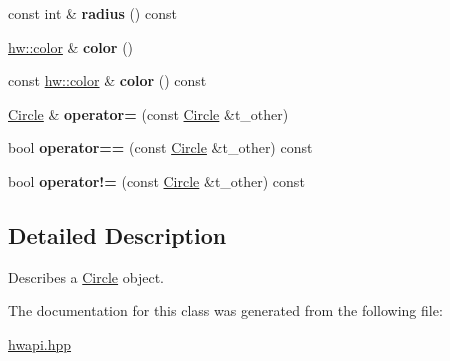 \begin{DoxyCompactItemize}
const int \& {\bfseries radius} () const
\item 
\mbox{\label{classdummy__api_1_1Circle_a800ad92a438310c71e11631c3adce684}} 
\mbox{\hyperlink{structhw_1_1color}{hw\+::color}} \& {\bfseries color} ()
\item 
\mbox{\label{classdummy__api_1_1Circle_a1be15dd16d55353e67e3175976c852a1}} 
const \mbox{\hyperlink{structhw_1_1color}{hw\+::color}} \& {\bfseries color} () const
\item 
\mbox{\label{classdummy__api_1_1Circle_aba499d1750ac58b781b2d22524c51095}} 
\mbox{\hyperlink{classdummy__api_1_1Circle}{Circle}} \& {\bfseries operator=} (const \mbox{\hyperlink{classdummy__api_1_1Circle}{Circle}} \&t\+\_\+other)
\item 
\mbox{\label{classdummy__api_1_1Circle_a97753a3826f553fd712e4e532d0e0684}} 
bool {\bfseries operator==} (const \mbox{\hyperlink{classdummy__api_1_1Circle}{Circle}} \&t\+\_\+other) const
\item 
\mbox{\label{classdummy__api_1_1Circle_a38586a3a29b65e92e78d078790952bbd}} 
bool {\bfseries operator!=} (const \mbox{\hyperlink{classdummy__api_1_1Circle}{Circle}} \&t\+\_\+other) const
\end{DoxyCompactItemize}


\subsection{Detailed Description}
Describes a \mbox{\hyperlink{classdummy__api_1_1Circle}{Circle}} object. 

The documentation for this class was generated from the following file\+:\begin{DoxyCompactItemize}
\item 
\mbox{\hyperlink{hwapi_8hpp}{hwapi.\+hpp}}\end{DoxyCompactItemize}
